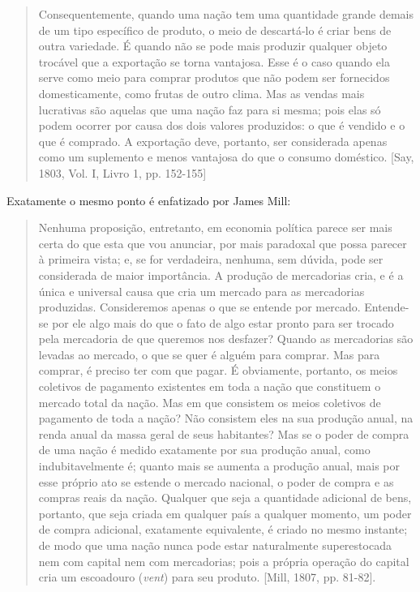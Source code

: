 \documentclass[12pt]{article}
\begin{document}
\begin{quote}
Consequentemente, quando uma nação tem uma quantidade grande demais de um tipo específico de produto, o meio de descartá-lo é criar bens de outra variedade. É quando não se pode mais produzir qualquer objeto trocável que a exportação se torna vantajosa. Esse é o caso quando ela serve como meio para comprar produtos que não podem ser fornecidos domesticamente, como frutas de outro clima. Mas as vendas mais lucrativas são aquelas que uma nação faz para si mesma; pois elas só podem ocorrer por causa dos dois valores produzidos: o que é vendido e o que é comprado. A exportação deve, portanto, ser considerada apenas como um suplemento e menos vantajosa do que o consumo doméstico. [Say, 1803, Vol. I, Livro 1, pp. 152-155]
\end{quote}

Exatamente o mesmo ponto é enfatizado por James Mill:

\begin{quote}
Nenhuma proposição, entretanto, em economia política parece ser mais certa do que esta que vou anunciar, por mais paradoxal que possa parecer à primeira vista; e, se for verdadeira, nenhuma, sem dúvida, pode ser considerada de maior importância. A produção de mercadorias cria, e é a única e universal causa que cria um mercado para as mercadorias produzidas. Consideremos apenas o que se entende por mercado. Entende-se por ele algo mais do que o fato de algo estar pronto para ser trocado pela mercadoria de que queremos nos desfazer? Quando as mercadorias são levadas ao mercado, o que se quer é alguém para comprar. Mas para comprar, é preciso ter com que pagar. É obviamente, portanto, os meios coletivos de pagamento existentes em toda a nação que constituem o mercado total da nação. Mas em que consistem os meios coletivos de pagamento de toda a nação? Não consistem eles na sua produção anual, na renda anual da massa geral de seus habitantes? Mas se o poder de compra de uma nação é medido exatamente por sua produção anual, como indubitavelmente é; quanto mais se aumenta a produção anual, mais por esse próprio ato se estende o mercado nacional, o poder de compra e as compras reais da nação. Qualquer que seja a quantidade adicional de bens, portanto, que seja criada em qualquer país a qualquer momento, um poder de compra adicional, exatamente equivalente, é criado no mesmo instante; de modo que uma nação nunca pode estar naturalmente superestocada nem com capital nem com mercadorias; pois a própria operação do capital cria um escoadouro (\textit{vent}) para seu produto. [Mill, 1807, pp. 81-82].
\end{quote}
\end{document}
